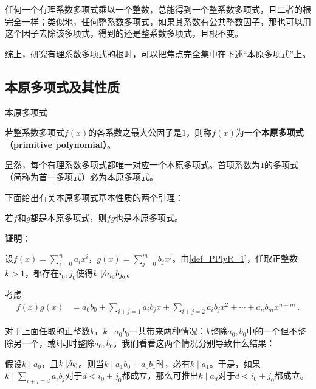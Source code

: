 

任何一个有理系数多项式乘以一个整数，总能得到一个整系数多项式，且二者的根完全一样；类似地，任何整系数多项式，如果其系数有公共整数因子，那也可以用这个因子去除该多项式，得到的还是整系数多项式，且根不变。

综上，研究有理系数多项式的根时，可以把焦点完全集中在下述“本原多项式”上。


\subsection{本原多项式及其性质}


\begin{definition}{本原多项式}\label{def_PPlyR_1}

若整系数多项式$f(x)$的各系数之最大公因子是$1$，则称$f(x)$为一个\textbf{本原多项式（primitive polynomial）}。

\end{definition}

显然，每个有理系数多项式都唯一对应一个本原多项式。首项系数为$1$的多项式（简称为首一多项式）必为本原多项式。

下面给出有关本原多项式基本性质的两个引理：

\begin{lemma}{}\label{lem_PPlyR_1}
若$f$和$g$都是本原多项式，则$fg$也是本原多项式。
\end{lemma}

\textbf{证明}：

设$f(x) = \sum_{i=0}^n a_ix^i$，$g(x) = \sum_{j=0}^m b_jx^j$。由\autoref{def_PPlyR_1}，任取正整数$k>1$，都存在$i_0, j_0$使得$k\not\mid a_{i_0}b_{j_0}$。

考虑
\begin{equation}\label{eq_PPlyR_1}
\begin{aligned}
f(x)g(x) &= a_0b_0 + \sum_{i+j=1}a_ib_jx + \sum_{i+j=2}a_ib_jx^2+\cdots +a_nb_mx^{n+m}~.
\end{aligned}
\end{equation}

对于上面任取的正整数$k$，$k\mid a_0b_0$一共带来两种情况：$k$整除$a_0, b_0$中的一个但不整除另一个，或$k$同时整除$a_0, b_0$。我们看看这两个情况分别导致什么结果：

假设$k\mid a_0$，且$k\not\mid b_0$。则当$k\mid a_1b_0+a_0b_1$时，必有$k\mid a_1$。于是，如果$k\mid\sum_{i+j=d}a_ib_j$对于$d<i_0+j_0$都成立，那么可推出$k\mid a_d$对于$d<i_0+j_0$都成立。

